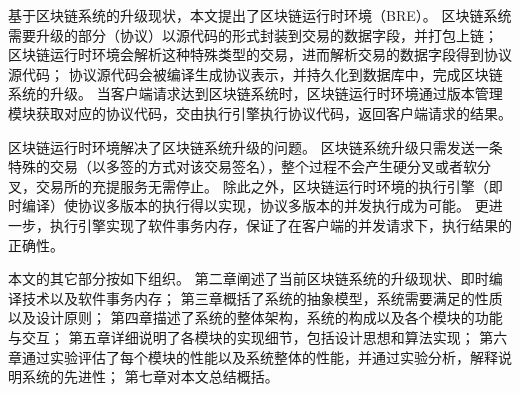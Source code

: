 基于区块链系统的升级现状，本文提出了区块链运行时环境（BRE）。
区块链系统需要升级的部分（协议）以源代码的形式封装到交易的数据字段，并打包上链；
区块链运行时环境会解析这种特殊类型的交易，进而解析交易的数据字段得到协议源代码；
协议源代码会被编译生成协议表示，并持久化到数据库中，完成区块链系统的升级。
当客户端请求达到区块链系统时，区块链运行时环境通过版本管理模块获取对应的协议代码，交由执行引擎执行协议代码，返回客户端请求的结果。

区块链运行时环境解决了区块链系统升级的问题。
区块链系统升级只需发送一条特殊的交易（以多签的方式对该交易签名），整个过程不会产生硬分叉或者软分叉，交易所的充提服务无需停止。
除此之外，区块链运行时环境的执行引擎（即时编译）使协议多版本的执行得以实现，协议多版本的并发执行成为可能。
更进一步，执行引擎实现了软件事务内存，保证了在客户端的并发请求下，执行结果的正确性。

本文的其它部分按如下组织。
第二章阐述了当前区块链系统的升级现状、即时编译技术以及软件事务内存；
第三章概括了系统的抽象模型，系统需要满足的性质以及设计原则；
第四章描述了系统的整体架构，系统的构成以及各个模块的功能与交互；
第五章详细说明了各模块的实现细节，包括设计思想和算法实现；
第六章通过实验评估了每个模块的性能以及系统整体的性能，并通过实验分析，解释说明系统的先进性；
第七章对本文总结概括。
